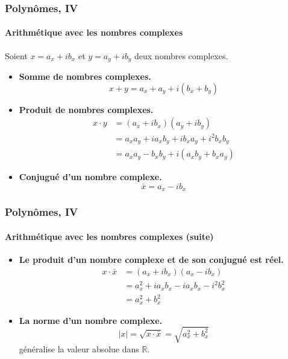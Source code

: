 \documentclass[10pt,notheorems]{beamer}
\theoremstyle{plain}
\theoremstyle{definition} %
\begin{document}
\begin{frame}
  \frametitle{Polynômes, IV}
  \framesubtitle{Arithmétique avec les nombres complexes}
  \hypertarget{slide_polynome_2_imaginaire_2}{}

  \bigskip

  Soient $x = a_x + i b_x$ et $y = a_y + i b_y$ deux nombres complexes.

  \bigskip

  \begin{itemize}

  \item \textbf{Somme de nombres complexes.}
    \[
      x+y = a_x+a_y + i(b_x+b_y)
    \]

    \bigskip

  \item \textbf{Produit de nombres complexes.}
    \[
      \begin{split}
        x \cdot y &= (a_x + i b_x)(a_y + i b_y)\\
        &= a_xa_y + i a_xb_y + ib_xa_y + i^2b_xb_y\\
        &= a_xa_y-b_xb_y + i(a_xb_y + b_xa_y)
      \end{split}
    \]

    \bigskip

  \item \textbf{Conjugué d'un nombre complexe.}
    \[
      \bar x = a_x - i b_x
    \]

  \end{itemize}

\end{frame}


\begin{frame}
  \frametitle{Polynômes, IV}
  \framesubtitle{Arithmétique avec les nombres complexes (suite)}
  \hypertarget{slide_polynome_2_imaginaire_3}{}

  \bigskip

  \begin{itemize}

  \item \textbf{Le produit d'un nombre complexe et de son conjugué est réel.}
    \[
      \begin{split}
        x \cdot \bar x &= (a_x + i b_x)(a_x - i b_x)\\
        &= a_x^2 + i a_xb_x - i a_x b_x - i^2 b_x^2\\
        &= a_x^2 + b_x^2
      \end{split}
    \]

    \bigskip

  \item \textbf{La norme d'un nombre complexe.}
    \[
      |x| = \sqrt{x \cdot \bar x} = \sqrt{a_x^2 + b_x^2}
    \]
    généralise la valeur absolue dans $\mathbb R$.

  \end{itemize}

\end{frame}
\end{document}
